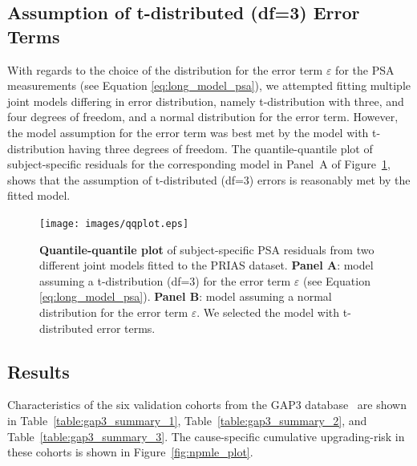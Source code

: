 \subsection{Assumption of t-distributed (df=3) Error Terms}
\label{subsec:t-dist-assumption}
With regards to the choice of the distribution for the error term $\varepsilon$ for the PSA measurements (see Equation \ref{eq:long_model_psa}), we attempted fitting multiple joint models differing in error distribution, namely t-distribution with three, and four degrees of freedom, and a normal distribution for the error term. However, the model assumption for the error term was best met by the model with t-distribution having three degrees of freedom. The quantile-quantile plot of subject-specific residuals for the corresponding model in Panel~A of Figure~\ref{fig:qqplot}, shows that the assumption of t-distributed (df=3) errors is reasonably met by the fitted model. 

\begin{figure}
\centerline{\texttt{[image: images/qqplot.eps]}}
\caption{\textbf{Quantile-quantile plot} of subject-specific PSA residuals from two different joint models fitted to the PRIAS dataset. \textbf{Panel A}: model assuming a t-distribution (df=3) for the error term $\varepsilon$ (see Equation \ref{eq:long_model_psa}). \textbf{Panel B}: model assuming a normal distribution for the error term $\varepsilon$. We selected the model with t-distributed error terms.}
\label{fig:qqplot}
\end{figure}

\clearpage
\subsection{Results}
Characteristics of the six validation cohorts from the GAP3 database~\citep{gap3_2018} are shown in Table~\ref{table:gap3_summary_1}, Table~\ref{table:gap3_summary_2}, and Table~\ref{table:gap3_summary_3}. The cause-specific cumulative upgrading-risk in these cohorts is shown in Figure~\ref{fig:npmle_plot}.

